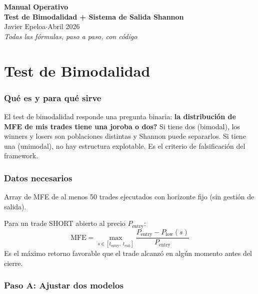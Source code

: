 \documentclass[11pt,a4paper]{article}
\begin{document}
\begin{center}
{\LARGE\bfseries Manual Operativo}\\[4pt]
{\LARGE\bfseries Test de Bimodalidad + Sistema de Salida Shannon}\\[16pt]
{\large Javier Epeloa\quad$\cdot$\quad Abril 2026}\\[4pt]
{\small\itshape Todas las f\'ormulas, paso a paso, con c\'odigo}
\end{center}

\vspace{12pt}
\tableofcontents
\newpage

\part{Test de Bimodalidad}

\section{Qu\'e es y para qu\'e sirve}

El test de bimodalidad responde una pregunta binaria: \textbf{la distribuci\'on de MFE de mis trades tiene una joroba o dos?} Si tiene dos (bimodal), los winners y losers son poblaciones distintas y Shannon puede separarlos. Si tiene una (unimodal), no hay estructura explotable. Es el criterio de falsificaci\'on del framework.

\section{Datos necesarios}

Array de MFE de al menos 50 trades ejecutados con horizonte fijo (sin gesti\'on de salida).

\begin{tcolorbox}[formula, title=Definici\'on de MFE]
Para un trade SHORT abierto al precio $P_{\text{entry}}$:
\begin{equation}
\text{MFE} = \max_{s \in [t_{\text{entry}},\; t_{\text{exit}}]} \frac{P_{\text{entry}} - P_{\text{low}}(s)}{P_{\text{entry}}}
\end{equation}
Es el m\'aximo retorno favorable que el trade alcanz\'o en alg\'un momento antes del cierre.
\end{tcolorbox}

\section{Paso A: Ajustar dos modelos}
\end{document}
